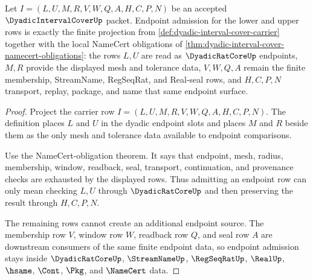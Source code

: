 \begin{theorem}
\label{thm:dyadic-interval-cover-endpoint-row-admission}
Let $I=(L,U,M,R,V,W,Q,A,H,C,P,N)$ be an accepted $\DyadicIntervalCoverUp$ packet. Endpoint admission for the lower and upper rows is exactly the finite projection from \autoref{def:dyadic-interval-cover-carrier} together with the local NameCert obligations of \autoref{thm:dyadic-interval-cover-namecert-obligations}: the rows $L,U$ are read as $\DyadicRatCoreUp$ endpoints, $M,R$ provide the displayed mesh and tolerance data, $V,W,Q,A$ remain the finite membership, StreamName, RegSeqRat, and Real-seal rows, and $H,C,P,N$ transport, replay, package, and name that same endpoint surface.
\end{theorem}
\begin{proof}
Project the carrier row $I=(L,U,M,R,V,W,Q,A,H,C,P,N)$. The definition places $L$ and $U$ in the dyadic endpoint slots and places $M$ and $R$ beside them as the only mesh and tolerance data available to endpoint comparisons.

Use the NameCert-obligation theorem. It says that endpoint, mesh, radius, membership, window, readback, seal, transport, continuation, and provenance checks are exhausted by the displayed rows. Thus admitting an endpoint row can only mean checking $L,U$ through $\DyadicRatCoreUp$ and then preserving the result through $H,C,P,N$.

The remaining rows cannot create an additional endpoint source. The membership row $V$, window row $W$, readback row $Q$, and seal row $A$ are downstream consumers of the same finite endpoint data, so endpoint admission stays inside $\DyadicRatCoreUp$, $\StreamNameUp$, $\RegSeqRatUp$, $\RealUp$, $\hsame$, $\Cont$, $\Pkg$, and $\NameCert$ data.
\end{proof}

